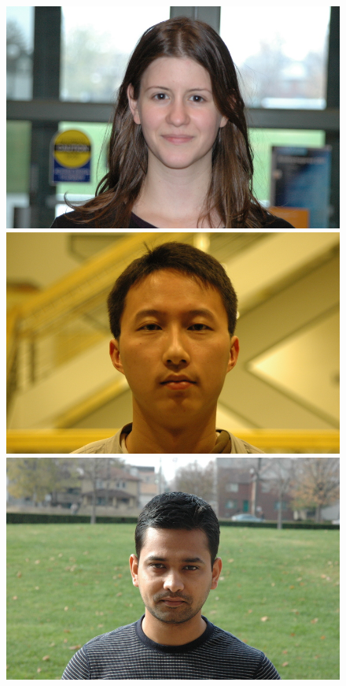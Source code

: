\begin{figure}
\centering
\includegraphics[scale=0.35,clip=true]{figures_cvpr/examples/1/DSC_1319.JPG} 
\includegraphics[scale=0.35,clip=true]{figures_cvpr/examples/1/DSC_1531.JPG} 
\includegraphics[scale=0.35,clip=true]{figures_cvpr/examples/1/DSC_1574.JPG} 

\end{figure}

